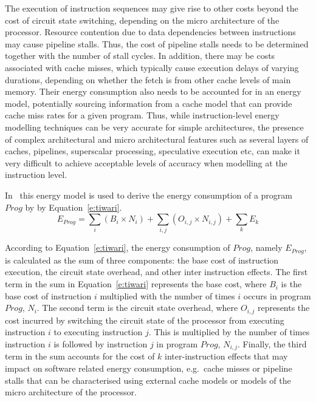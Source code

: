 \documentclass[oneside]{book}
\begin{document}
The execution of instruction sequences may give rise to other costs beyond the
cost of circuit state switching, depending on the micro architecture of the
processor. Resource contention due to data dependencies between instructions
may cause pipeline stalls. Thus, the cost of pipeline stalls needs to be
determined together with the number of stall cycles.
%
In addition, there may be costs associated with cache misses, which typically
cause execution delays of varying durations, depending on whether the fetch is
from other cache levels of main memory. Their energy consumption also needs to
be accounted for in an energy model, potentially sourcing information from a
cache model that can provide cache miss rates for a given program. 
%
Thus, while instruction-level energy modelling techniques can be very accurate
for simple architectures, the presence of complex architectural and micro
architectural features such as several layers of caches, pipelines, superscalar
processing, speculative execution etc, can make it very difficult to achieve
acceptable levels of accuracy when modelling at the instruction level.

In~\cite{TiwariWolfeInstructionLevelPowerAnalysi:1996} this energy model is
used to derive the energy consumption of a program $Prog$ by 
 by Equation~\ref{e:tiwari}.
%
\begin{equation}\label{e:tiwari}
E_{Prog} = \sum_i (B_i \times N_i) + \sum_{i,j} (O_{i,j} \times N_{i,j}) + \sum_k E_k
\end{equation}

According to Equation~\ref{e:tiwari}, the energy consumption of $Prog$, namely $E_{Prog}$, is
calculated as the sum of three components: the base cost
of instruction
execution, the
circuit state overhead, and other inter instruction effects.
%
The first term in the sum in Equation~\ref{e:tiwari} represents the base cost, where $B_i$ is
the base cost of instruction $i$ multiplied with the number of times $i$ occurs
in program $\mathit{Prog}$, $N_i$.
%
The second term is the circuit state overhead, where $O_{i,j}$ represents the
cost incurred by switching the circuit state of the processor from executing
instruction $i$ to executing instruction $j$. This is multiplied by the number of
times instruction $i$ is followed by instruction $j$ in program $\mathit{Prog}$, $N_{i,j}$. 
%
Finally, the third term in the sum accounts for the cost of $k$ inter-instruction
effects that may impact on software related energy consumption, e.g.\ cache
misses or pipeline stalls that can be characterised using external cache models
or models of the micro architecture of the processor.
\end{document}
